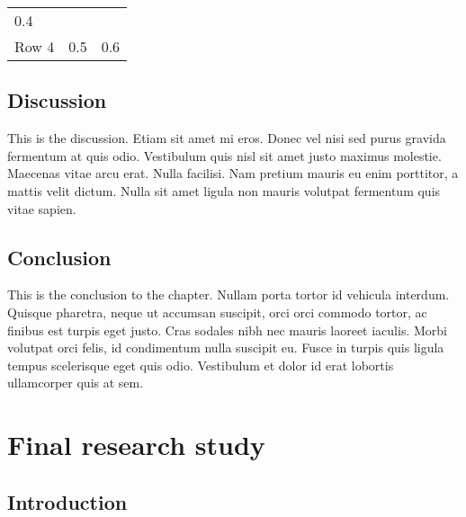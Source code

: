 \documentclass[11pt,letterpaper,]{article}
\begin{document}
\begin{longtable}[c]{@{}lll@{}}
\begin{minipage}[t]{0.24\columnwidth}\raggedright\strut
0.4
\strut\end{minipage}\tabularnewline
\begin{minipage}[t]{0.25\columnwidth}\raggedright\strut
Row 4
\strut\end{minipage} &
\begin{minipage}[t]{0.30\columnwidth}\raggedright\strut
0.5
\strut\end{minipage} &
\begin{minipage}[t]{0.24\columnwidth}\raggedright\strut
0.6
\strut\end{minipage}\tabularnewline
\bottomrule
\end{longtable}

\subsection{Discussion}\label{discussion-2}

This is the discussion. Etiam sit amet mi eros. Donec vel nisi sed purus
gravida fermentum at quis odio. Vestibulum quis nisl sit amet justo
maximus molestie. Maecenas vitae arcu erat. Nulla facilisi. Nam pretium
mauris eu enim porttitor, a mattis velit dictum. Nulla sit amet ligula
non mauris volutpat fermentum quis vitae sapien.

\subsection{Conclusion}\label{conclusion-3}

This is the conclusion to the chapter. Nullam porta tortor id vehicula
interdum. Quisque pharetra, neque ut accumsan suscipit, orci orci
commodo tortor, ac finibus est turpis eget justo. Cras sodales nibh nec
mauris laoreet iaculis. Morbi volutpat orci felis, id condimentum nulla
suscipit eu. Fusce in turpis quis ligula tempus scelerisque eget quis
odio. Vestibulum et dolor id erat lobortis ullamcorper quis at sem.

\section{Final research study}\label{final-research-study}

\subsection{Introduction}\label{introduction-4}
\end{document}
